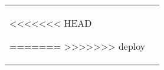 \documentclass[10pt]{article}
\begin{document}
\begin{table}[H]
\begin{tabular}{p{1.6cm}p{12cm}}
\begin{enumerate}
\begin{enumerate}
\begin{enumerate}
\end{enumerate}
<<<<<<< HEAD

=======
%
>>>>>>> deploy
%


\end{enumerate}
\end{enumerate}
\end{tabular}
\end{table}
\end{document}
